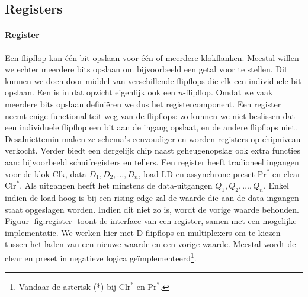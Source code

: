 \subsection{Registers}
\label{ss:registers}
\paragraph{Register}Een flipflop kan \'e\'en bit opslaan voor \'e\'en of meerdere klokflanken. Meestal willen we echter meerdere bits opslaan om bijvoorbeeld een getal voor te stellen. Dit kunnen we doen door middel van verschillende flipflops die elk een individuele bit opslaan. Een  is in dat opzicht eigenlijk ook een $n$-flipflop. Omdat we vaak meerdere bits opslaan defini\"eren we dus het registercomponent. Een register neemt enige functionaliteit weg van de flipflops: zo kunnen we niet beslissen dat een individuele flipflop een bit aan de ingang opslaat, en de andere flipflops niet. Desalniettemin maken ze schema's eenvoudiger en worden registers op chipniveau verkocht. Verder biedt een dergelijk chip naast geheugenopslag ook extra functies aan: bijvoorbeeld schuifregisters en tellers. Een register heeft tradioneel ingangen voor de klok $\mbox{Clk}$, data $D_1, D_2,\ldots, D_n$, load $\mbox{LD}$ en assynchrone preset $\mbox{Pr}^*$ en clear $\mbox{Clr}^*$. Als uitgangen heeft het minstens de data-uitgangen $Q_1, Q_2, \ldots, Q_n$. Enkel indien de load hoog is bij een rising edge zal de waarde die aan de data-ingangen staat opgeslagen worden. Indien dit niet zo is, wordt de vorige waarde behouden. Figuur \ref{fig:register} toont de interface van een register, samen met een mogelijke implementatie. We werken hier met D-flipflops en multiplexers om te kiezen tussen het laden van een nieuwe waarde en een vorige waarde. Meestal wordt de clear en preset in negatieve logica ge\"implementeerd\footnote{Vandaar de asterisk (*) bij $\mbox{Clr}^*$ en $\mbox{Pr}^*$.}.
